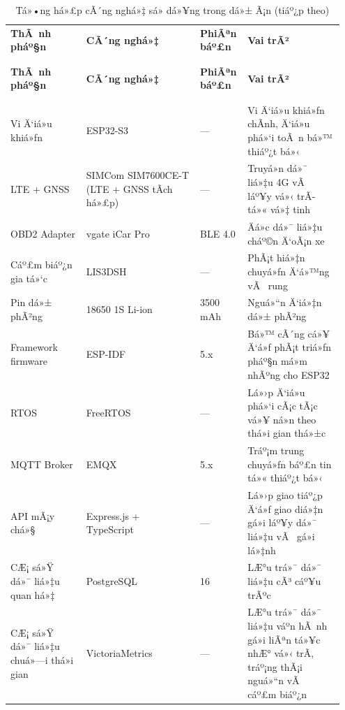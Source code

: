 \documentclass[a4paper]{extarticle}
\newcommand{\thesissettableid}[2]{%
  \renewcommand{\thetable}{#1}%
  \renewcommand{\theHtable}{#2}%
}
\begin{document}
{\thesissettableid{1.3}{tab-ch1-technology-stack-summary}
\def\LTcaptype{table}
\begin{longtable}{|L{0.223\linewidth}|L{0.334\linewidth}|L{0.115\linewidth}|L{0.282\linewidth}|}
\caption{Tá»•ng há»£p cÃ´ng nghá»‡ sá»­ dá»¥ng trong dá»± Ã¡n}\label{tab:ch1-technology-stack-summary}\\
\hline \textbf{ThÃ nh pháº§n} & \textbf{CÃ´ng nghá»‡} & \textbf{PhiÃªn báº£n} & \textbf{Vai trÃ²} \\
\\\hline
\endfirsthead
\caption[]{Tá»•ng há»£p cÃ´ng nghá»‡ sá»­ dá»¥ng trong dá»± Ã¡n (tiáº¿p theo)}\\
\hline \textbf{ThÃ nh pháº§n} & \textbf{CÃ´ng nghá»‡} & \textbf{PhiÃªn báº£n} & \textbf{Vai trÃ²} \\
\\\hline
\endhead
\\\hline
\endfoot
\endlastfoot
Vi Ä‘iá»u khiá»ƒn & ESP32-S3 & --- & Vi Ä‘iá»u khiá»ƒn chÃ­nh, Ä‘iá»u phá»‘i toÃ n bá»™
thiáº¿t bá»‹ \\\hline
LTE + GNSS & SIMCom SIM7600CE-T (LTE + GNSS tÃ­ch há»£p) & --- & Truyá»n dá»¯
liá»‡u 4G vÃ  láº¥y vá»‹ trÃ­ tá»« vá»‡ tinh \\\hline
OBD2 Adapter & vgate iCar Pro & BLE 4.0 & Äá»c dá»¯ liá»‡u cháº©n Ä‘oÃ¡n xe \\\hline
Cáº£m biáº¿n gia tá»‘c & LIS3DSH & --- & PhÃ¡t hiá»‡n chuyá»ƒn Ä‘á»™ng vÃ  rung \\\hline
Pin dá»± phÃ²ng & 18650 1S Li-ion & 3500 mAh & Nguá»“n Ä‘iá»‡n dá»± phÃ²ng \\\hline
Framework firmware & ESP-IDF & 5.x & Bá»™ cÃ´ng cá»¥ Ä‘á»ƒ phÃ¡t triá»ƒn pháº§n má»m
nhÃºng cho ESP32 \\\hline
RTOS & FreeRTOS & --- & Lá»›p Ä‘iá»u phá»‘i cÃ¡c tÃ¡c vá»¥ ná»n theo thá»i gian thá»±c \\\hline
MQTT Broker & EMQX & 5.x & Tráº¡m trung chuyá»ƒn báº£n tin tá»« thiáº¿t bá»‹ \\\hline
API mÃ¡y chá»§ & Express.js + TypeScript & --- & Lá»›p giao tiáº¿p Ä‘á»ƒ
giao diá»‡n gá»i láº¥y dá»¯ liá»‡u vÃ  gá»­i lá»‡nh \\\hline
CÆ¡ sá»Ÿ dá»¯ liá»‡u quan há»‡ & PostgreSQL & 16 & LÆ°u trá»¯ dá»¯ liá»‡u cÃ³ cáº¥u trÃºc \\\hline
CÆ¡ sá»Ÿ dá»¯ liá»‡u chuá»—i thá»i gian & VictoriaMetrics & --- & LÆ°u trá»¯
dá»¯ liá»‡u váº­n hÃ nh gá»­i liÃªn tá»¥c nhÆ° vá»‹ trÃ­, tráº¡ng thÃ¡i nguá»“n vÃ  cáº£m biáº¿n \\\hline

\end{longtable}}
\end{document}
